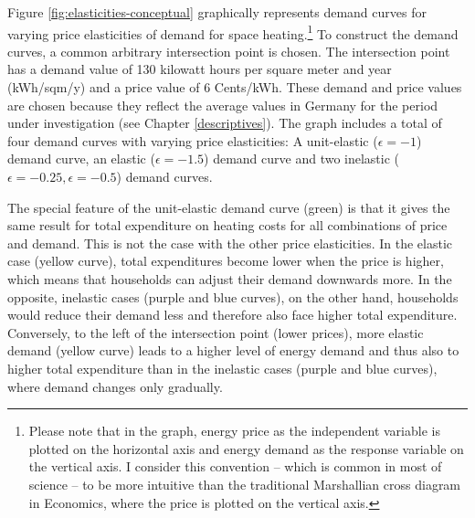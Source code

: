 \documentclass[12pt,twoside]{reedthesis}
\begin{document}
Figure \ref{fig:elasticities-conceptual} graphically represents demand curves for varying price elasticities of demand for space heating.\footnote{Please note that in the graph, energy price as the independent variable is plotted on the horizontal axis and energy demand as the response variable on the vertical axis. I consider this convention -- which is common in most of science -- to be more intuitive than the traditional Marshallian cross diagram in Economics, where the price is plotted on the vertical axis.} To construct the demand curves, a common arbitrary intersection point is chosen. The intersection point has a demand value of 130 kilowatt hours per square meter and year (kWh/sqm/y) and a price value of 6 Cents/kWh. These demand and price values are chosen because they reflect the average values in Germany for the period under investigation (see Chapter \ref{descriptives}). The graph includes a total of four demand curves with varying price elasticities: A unit-elastic (\(\epsilon = -1\)) demand curve, an elastic (\(\epsilon = -1.5\)) demand curve and two inelastic (\(\epsilon = -0.25, \epsilon = -0.5\)) demand curves.

The special feature of the unit-elastic demand curve (green) is that it gives the same result for total expenditure on heating costs for all combinations of price and demand. This is not the case with the other price elasticities. In the elastic case (yellow curve), total expenditures become lower when the price is higher, which means that households can adjust their demand downwards more. In the opposite, inelastic cases (purple and blue curves), on the other hand, households would reduce their demand less and therefore also face higher total expenditure. Conversely, to the left of the intersection point (lower prices), more elastic demand (yellow curve) leads to a higher level of energy demand and thus also to higher total expenditure than in the inelastic cases (purple and blue curves), where demand changes only gradually.
\end{document}
